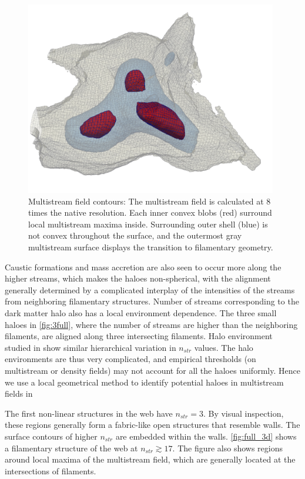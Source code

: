 \begin{figure} 
\centering\includegraphics[width=11cm]{Chapter5/Source_v2/fig2.pdf} 
\caption{Multistream field contours: The multistream field is calculated at 8 times the native resolution. Each inner convex blobs (red) surround local multistream maxima inside. Surrounding outer shell (blue) is not convex throughout the surface, and the outermost gray multistream surface displays the transition to filamentary geometry.}
\label{fig:3full}
\end{figure}


Caustic formations and mass accretion are also seen to occur more along the higher streams, which makes the haloes non-spherical, with the alignment generally determined by a complicated interplay  of the intensities of the streams from neighboring filamentary structures. Number of streams corresponding to the dark matter halo also has a local environment dependence. The three small haloes in \autoref{fig:3full}, where the number of streams are higher than the neighboring filaments, are aligned along three intersecting filaments. Halo environment studied in \cite{Ramachandra2015} show similar hierarchical variation in $n_{str}$ values. The halo environments are thus very complicated, and empirical thresholds (on multistream or density fields) may not account for all the haloes uniformly. Hence we use a local geometrical method to identify potential haloes in multistream fields in \cite{Ramachandra2017b}


The first non-linear structures in the web have $n_{str} = 3$. By visual inspection, these regions generally form a fabric-like open structures that resemble walls. The surface contours of higher $n_{str}$ are embedded within the walls. \autoref{fig:full_3d} shows a filamentary structure of the web at $n_{str} \gtrsim 17$. The figure also shows regions around local maxima of the multistream field, which are generally located at the intersections of filaments.    








